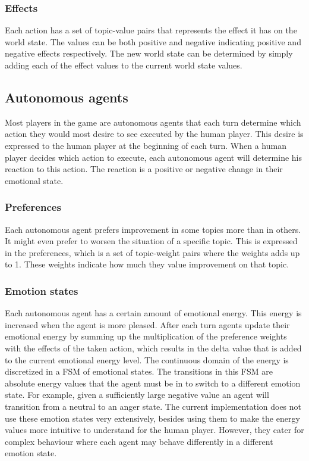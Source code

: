 \documentclass[11pt,a4paper]{article}
\begin{document}
    \subsubsection{Effects}
      Each action has a set of topic-value pairs that represents the effect it has on the world state. The values can be both positive and negative indicating positive and negative effects respectively. The new world state can be determined by simply adding each of the effect values to the current world state values.
  \subsection{Autonomous agents}
    Most players in the game are autonomous agents that each turn determine which action they would most desire to see executed by the human player. This desire is expressed to the human player at the beginning of each turn. When a human player decides which action to execute, each autonomous agent will determine his reaction to this action. The reaction is a positive or negative change in their emotional state.
    \subsubsection{Preferences}
      Each autonomous agent prefers improvement in some topics more than in others. It might even prefer to worsen the situation of a specific topic. This is expressed in the preferences, which is a set of topic-weight pairs where the weights adds up to 1. These weights indicate how much they value improvement on that topic.
    \subsubsection{Emotion states}
      Each autonomous agent has a certain amount of emotional energy. This energy is increased when the agent is more pleased. After each turn agents update their emotional energy by summing up the multiplication of the preference weights with the effects of the taken action, which results in the delta value that is added to the current emotional energy level. The continuous domain of the energy is discretized in a FSM of emotional states. The transitions in this FSM are absolute energy values that the agent must be in to switch to a different emotion state. For example, given a sufficiently large negative value an agent will transition from a neutral to an anger state. The current implementation does not use these emotion states very extensively, besides using them to make the energy values more intuitive to understand for the human player. However, they cater for complex behaviour where each agent may behave differently in a different emotion state.
\end{document}
